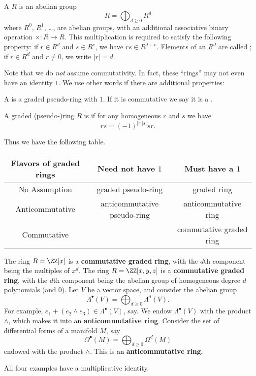 \begin{definition}
	A  $R$ is an abelian group
	\[ R = \bigoplus_{d \ge 0} R^d \]
	where $R^0$, $R^1$, \dots, are abelian groups,
	with an additional associative binary operation $\times : R \to R$.
	This multiplication is required to satisfy the following property:
	if $r \in R^d$ and $s \in R^e$, we have $rs \in R^{d+e}$.
	Elements of an $R^d$ are called ;
	if $r \in R^d$ and $r \neq 0$, we write $|r| = d$.
\end{definition}
Note that we do \emph{not} assume commutativity.
In fact, these ``rings'' may not even have an identity $1$.
We use other words if there are additional properties:
\begin{definition}
	A  is a graded pseudo-ring with $1$.
	If it is commutative we say it is a .
\end{definition}
\begin{definition}
	A graded (pseudo-)ring $R$ is  if
	for any homogeneous $r$ and $s$ we have
	\[ rs = (-1)^{|r| |s|} sr. \]
\end{definition}

Thus we have the following table.

\begin{center}
	\small
	\begin{tabular}[h]{|c|cc|}
		\hline
		\textbf{Flavors of graded rings} &
		Need not have $1$ & Must have a $1$ \\ \hline
		No Assumption & graded pseudo-ring & graded ring \\
		Anticommutative & anticommutative pseudo-ring & anticommutative ring \\
		Commutative &  & commutative graded ring \\ \hline
	\end{tabular}
\end{center}

\begin{example}
	\listhack
	\begin{enumerate}[(a)]
		\ii The ring $R = \ZZ[x]$ is a \textbf{commutative graded ring},
		with the $d$th component being the multiples of $x^d$.
		\ii The ring $R = \ZZ[x,y,z]$ is a \textbf{commutative graded ring},
		with the $d$th component being the abelian group
		of homogeneous degree $d$ polynomials (and $0$).
		\ii Let $V$ be a vector space, and consider
		the abelian group
		\[ \Lambda^\bullet(V) = \bigoplus_{d \ge 0} \Lambda^d(V). \]
		For example, $e_1 + (e_2 \wedge e_3) \in \Lambda^\bullet(V)$, say.
		We endow $\Lambda^\bullet(V)$ with the product $\wedge$,
		which makes it into an \textbf{anticommutative ring}.
		\ii Consider the set of differential forms of a manifold $M$,
		say \[ \Omega^\bullet(M) = \bigoplus_{d \ge 0} \Omega^d(M) \]
		endowed with the product $\wedge$.
		This is an \textbf{anticommutative ring}.
	\end{enumerate}
	All four examples have a multiplicative identity.
\end{example}

